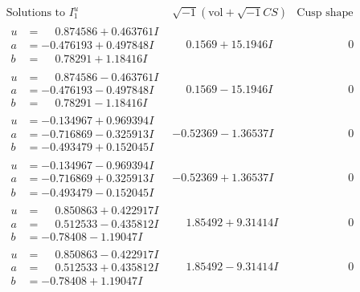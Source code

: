 \documentclass[1p]{elsarticle_modified}
\theoremstyle{definition}
\newcommand{\I}{\sqrt{-1}}
\begin{document}
$$\begin{array}{c|c|c}  
\text{Solutions to }I^u_{1}& \I (\text{vol} + \sqrt{-1}CS) & \text{Cusp shape}\\
 \hline 
\begin{aligned}
u &= \phantom{-}0.874586 + 0.463761 I \\
a &= -0.476193 + 0.497848 I \\
b &= \phantom{-}0.78291 + 1.18416 I\end{aligned}
 & \phantom{-}0.1569 + 15.1946 I & \phantom{-0.000000 } 0 \\ \hline\begin{aligned}
u &= \phantom{-}0.874586 - 0.463761 I \\
a &= -0.476193 - 0.497848 I \\
b &= \phantom{-}0.78291 - 1.18416 I\end{aligned}
 & \phantom{-}0.1569 - 15.1946 I & \phantom{-0.000000 } 0 \\ \hline\begin{aligned}
u &= -0.134967 + 0.969394 I \\
a &= -0.716869 - 0.325913 I \\
b &= -0.493479 + 0.152045 I\end{aligned}
 & -0.52369 - 1.36537 I & \phantom{-0.000000 } 0 \\ \hline\begin{aligned}
u &= -0.134967 - 0.969394 I \\
a &= -0.716869 + 0.325913 I \\
b &= -0.493479 - 0.152045 I\end{aligned}
 & -0.52369 + 1.36537 I & \phantom{-0.000000 } 0 \\ \hline\begin{aligned}
u &= \phantom{-}0.850863 + 0.422917 I \\
a &= \phantom{-}0.512533 - 0.435812 I \\
b &= -0.78408 - 1.19047 I\end{aligned}
 & \phantom{-}1.85492 + 9.31414 I & \phantom{-0.000000 } 0 \\ \hline\begin{aligned}
u &= \phantom{-}0.850863 - 0.422917 I \\
a &= \phantom{-}0.512533 + 0.435812 I \\
b &= -0.78408 + 1.19047 I\end{aligned}
 & \phantom{-}1.85492 - 9.31414 I & \phantom{-0.000000 } 0 \\ \hline\begin{aligned}

\end{aligned}
\end{array}$$
\end{document}
